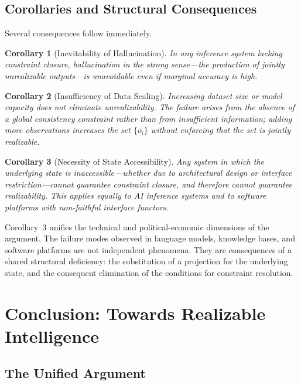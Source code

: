 \documentclass[12pt, oneside]{article}
\newtheorem{corollary}{Corollary}
\begin{document}
\subsection{Corollaries and Structural Consequences}

Several consequences follow immediately.

\begin{corollary}[Inevitability of Hallucination]
In any inference system lacking constraint closure, hallucination in the strong sense---the production of jointly unrealizable outputs---is unavoidable even if marginal accuracy is high.
\end{corollary}

\begin{corollary}[Insufficiency of Data Scaling]
Increasing dataset size or model capacity does not eliminate unrealizability. The failure arises from the absence of a global consistency constraint rather than from insufficient information; adding more observations increases the set $\{o_i\}$ without enforcing that the set is jointly realizable.
\end{corollary}

\begin{corollary}[Necessity of State Accessibility]
Any system in which the underlying state is inaccessible---whether due to architectural design or interface restriction---cannot guarantee constraint closure, and therefore cannot guarantee realizability. This applies equally to AI inference systems and to software platforms with non-faithful interface functors.
\end{corollary}

Corollary~3 unifies the technical and political-economic dimensions of the argument. The failure modes observed in language models, knowledge bases, and software platforms are not independent phenomena. They are consequences of a shared structural deficiency: the substitution of a projection for the underlying state, and the consequent elimination of the conditions for constraint resolution.

\section{Conclusion: Towards Realizable Intelligence}

\subsection{The Unified Argument}
\end{document}
